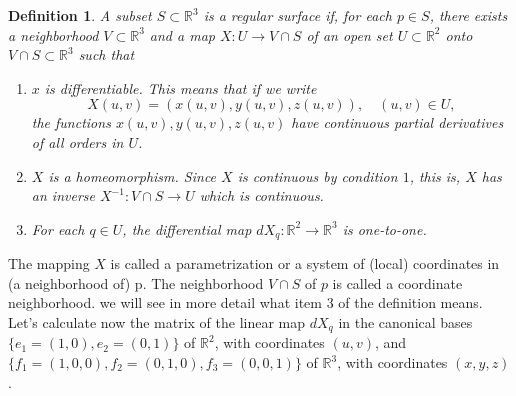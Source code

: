 \documentclass{amsart}
\theoremstyle{plain}
\newtheorem{definition}{\bf Definition}
\numberwithin{equation}{section}
\begin{document}
\begin{definition}\label{definicao superficie}
	A subset $S \subset \mathbb{R}^3$ is a regular surface if, for each $p \in S$, there exists a neighborhood $V \subset \mathbb{R}^3$ and a map $X: U \longrightarrow V \cap S$ of an open set $U \subset \mathbb{R}^2$ onto $V \cap S \subset \mathbb{R}^3$ such that
	\begin{enumerate}
		\item[a)] $x$ is differentiable. This means that if we write
		$$
		X(u,v) = (x(u,v), y(u,v), z(u,v)), \quad (u,v) \in U,
		$$
		the functions $x(u,v),y(u,v),z(u,v)$ have continuous partial derivatives of all orders in $U$.
		
		\item[b)] $X$ is a homeomorphism. Since $X$ is continuous by condition $1$, this is, $X$ has an inverse $X^{-1}: V\cap S \longrightarrow U$ which is continuous.
		
		\item[c)] For each $q \in U$, the differential map $dX_q: \mathbb{R}^2 \longrightarrow \mathbb{R}^3$ is one-to-one.
		
	\end{enumerate}
	
\end{definition}

The mapping $X$ is called a parametrization or a system of (local) coordinates in (a neighborhood of) p. The neighborhood $V \cap S$ of $p$ is called a coordinate neighborhood. we will see in more detail what item 3 of the definition means. Let's calculate now the matrix of the linear map \( dX_q \) in the canonical bases $\{ e_1=(1,0), e_2=(0,1) \}$ of $\mathbb{R}^2$, with coordinates $(u, v)$, and $\{ f_1 = (1, 0, 0), f_2 = (0, 1, 0), f_3 = (0, 0, 1) \}$ of $\mathbb{R}^3$, with coordinates $(x, y, z)$.
\end{document}
